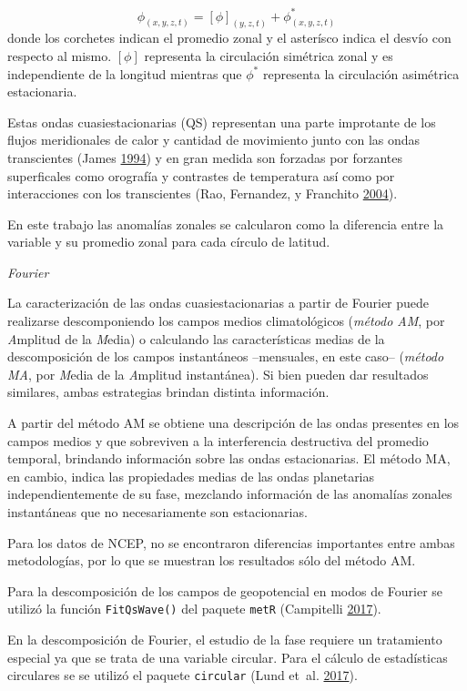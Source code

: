 \documentclass[spanish,a4paper,12p]{book}
\begin{document}
\[
\phi_{(x, y, z, t)} = [\phi]_{(y, z, t)} + \phi_{(x, y, z, t)}^*
\] donde los corchetes indican el promedio zonal y el asterísco indica
el desvío con respecto al mismo. \([\phi]\) representa la circulación
simétrica zonal y es independiente de la longitud mientras que
\(\phi^*\) representa la circulación asimétrica estacionaria.

Estas ondas cuasiestacionarias (QS) representan una parte improtante de
los flujos meridionales de calor y cantidad de movimiento junto con las
ondas transcientes (James \protect\hyperlink{ref-James}{1994}) y en gran
medida son forzadas por forzantes superficales como orografía y
contrastes de temperatura así como por interacciones con los
transcientes (Rao, Fernandez, y Franchito
\protect\hyperlink{ref-Rao2004}{2004}).

En este trabajo las anomalías zonales se calcularon como la diferencia
entre la variable y su promedio zonal para cada círculo de latitud.

\emph{Fourier}

La caracterización de las ondas cuasiestacionarias a partir de Fourier
puede realizarse descomponiendo los campos medios climatológicos
(\emph{método AM}, por \emph{A}mplitud de la \emph{M}edia) o calculando
las características medias de la descomposición de los campos
instantáneos --mensuales, en este caso-- (\emph{método MA}, por
\emph{M}edia de la \emph{A}mplitud instantánea). Si bien pueden dar
resultados similares, ambas estrategias brindan distinta información.

A partir del método AM se obtiene una descripción de las ondas presentes
en los campos medios y que sobreviven a la interferencia destructiva del
promedio temporal, brindando información sobre las ondas estacionarias.
El método MA, en cambio, indica las propiedades medias de las ondas
planetarias independientemente de su fase, mezclando información de las
anomalías zonales instantáneas que no necesariamente son estacionarias.

Para los datos de NCEP, no se encontraron diferencias importantes entre
ambas metodologías, por lo que se muestran los resultados sólo del
método AM.

Para la descomposición de los campos de geopotencial en modos de Fourier
se utilizó la función \texttt{FitQsWave()} del paquete \texttt{metR}
(Campitelli \protect\hyperlink{ref-R-metR}{2017}).

En la descomposición de Fourier, el estudio de la fase requiere un
tratamiento especial ya que se trata de una variable circular. Para el
cálculo de estadísticas circulares se se utilizó el paquete
\texttt{circular} (Lund et~al.
\protect\hyperlink{ref-R-circular}{2017}).
\end{document}
